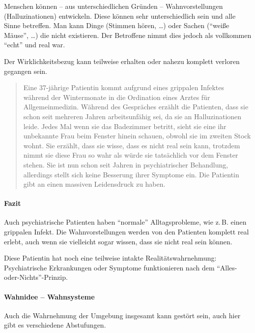 Menschen können -- aus unterschiedlichen Gründen --
Wahnvorstellungen (Halluzinationen) entwickeln. Diese
können sehr unterschiedlich sein und alle Sinne betreffen.
Man kann Dinge  (Stimmen hören, \ldots)  oder
Sachen  ("`weiße Mäuse"', \ldots) die nicht
existieren. Der Betroffene nimmt dies jedoch als vollkommen
"`echt"' und real war. 

Der Wirklichkeitsbezug kann teilweise erhalten oder nahezu
komplett verloren gegangen sein. 




\begin{quotation}
Eine 37-jährige Patientin kommt aufgrund eines
grippalen Infektes während der Wintermonate in die
Ordination eines Arztes für Allgemeinmedizin. Während des
Gespräches erzählt die Patienten, dass sie schon seit
mehreren Jahren arbeitsunfähig sei, da sie an
Halluzinationen leide. Jedes Mal wenn sie das Badezimmer
betritt, sieht sie eine ihr unbekannte Frau beim Fenster
hinein schauen, obwohl sie im zweiten Stock wohnt. Sie
erzählt, dass sie wisse, dass es nicht real sein kann,
trotzdem nimmt sie diese Frau so wahr als würde sie
tatsächlich vor dem Fenster stehen. Sie ist nun schon seit
Jahren in psychiatrischer Behandlung, allerdings stellt
sich keine Besserung ihrer Symptome ein. Die Patientin gibt
an einen massiven Leidensdruck zu haben.
\end{quotation}



\paragraph{Fazit}

Auch psychiatrische Patienten haben "`normale"'
Alltagsprobleme, wie z.\,B. einen grippalen Infekt. Die
Wahnvorstellungen werden von den Patienten komplett real
erlebt, auch wenn sie vielleicht sogar wissen, dass sie nicht
real sein können. 

Diese Patientin hat noch eine teilweise
intakte Realitätswahrnehmung: Psychiatrische Erkrankungen
oder Symptome funktionieren  nach dem
"`Alles-oder-Nichts"'-Prinzip.


\paragraph{Wahnidee -- Wahnsysteme}

Auch die Wahrnehmung der Umgebung insgesamt kann gestört
sein, auch hier gibt es verschiedene Abstufungen. 

